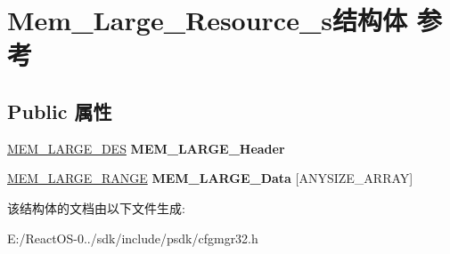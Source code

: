 \hypertarget{struct_mem___large___resource__s}{}\section{Mem\+\_\+\+Large\+\_\+\+Resource\+\_\+s结构体 参考}
\label{struct_mem___large___resource__s}
\subsection*{Public 属性}
\begin{DoxyCompactItemize}
\item 
\mbox{\label{struct_mem___large___resource__s_a083e1f19a90c7955568191d45bc49c71}} 
\hyperlink{struct_mem___large___des__s}{M\+E\+M\+\_\+\+L\+A\+R\+G\+E\+\_\+\+D\+ES} {\bfseries M\+E\+M\+\_\+\+L\+A\+R\+G\+E\+\_\+\+Header}
\item 
\mbox{\label{struct_mem___large___resource__s_a0d2ade48ae61951e9107f195fe6d7994}} 
\hyperlink{struct_mem___large___range__s}{M\+E\+M\+\_\+\+L\+A\+R\+G\+E\+\_\+\+R\+A\+N\+GE} {\bfseries M\+E\+M\+\_\+\+L\+A\+R\+G\+E\+\_\+\+Data} \mbox{[}A\+N\+Y\+S\+I\+Z\+E\+\_\+\+A\+R\+R\+AY\mbox{]}
\end{DoxyCompactItemize}


该结构体的文档由以下文件生成\+:\begin{DoxyCompactItemize}
\item 
E\+:/\+React\+O\+S-\/0../sdk/include/psdk/cfgmgr32.\+h\end{DoxyCompactItemize}
